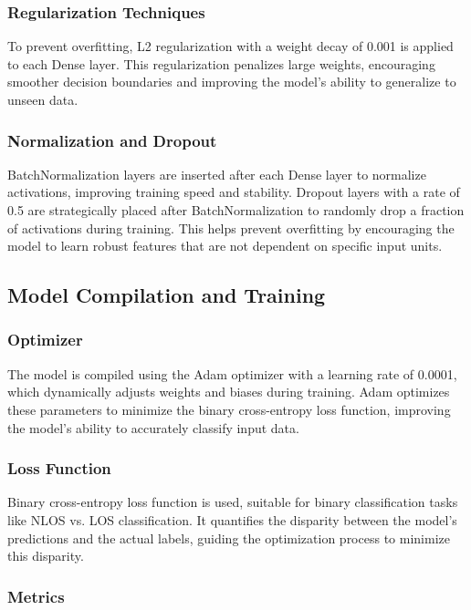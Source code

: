 \subsubsection{Regularization Techniques}

To prevent overfitting, L2 regularization with a weight decay of 0.001 is applied to each Dense layer. This regularization penalizes large weights, encouraging smoother decision boundaries and improving the model's ability to generalize to unseen data.

\subsubsection{Normalization and Dropout}

BatchNormalization layers are inserted after each Dense layer to normalize activations, improving training speed and stability. Dropout layers with a rate of 0.5 are strategically placed after BatchNormalization to randomly drop a fraction of activations during training. This helps prevent overfitting by encouraging the model to learn robust features that are not dependent on specific input units.

\subsection{Model Compilation and Training}

\subsubsection{Optimizer}

The model is compiled using the Adam optimizer with a learning rate of 0.0001, which dynamically adjusts weights and biases during training. Adam optimizes these parameters to minimize the binary cross-entropy loss function, improving the model's ability to accurately classify input data.

\subsubsection{Loss Function}

Binary cross-entropy loss function is used, suitable for binary classification tasks like NLOS vs. LOS classification. It quantifies the disparity between the model's predictions and the actual labels, guiding the optimization process to minimize this disparity.

\subsubsection{Metrics}

